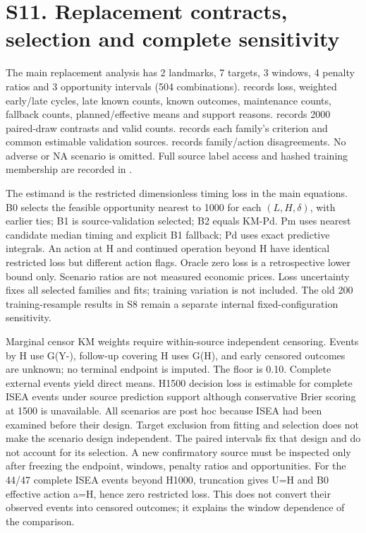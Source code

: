 \documentclass[10pt,a4paper]{article}
\begin{document}
\section*{S11. Replacement contracts, selection and complete sensitivity}
The main replacement analysis has 2 landmarks, 7 targets, 3 windows, 4 penalty ratios and 3 opportunity intervals (504 combinations).  records loss, weighted early/late cycles, late known counts, known outcomes, maintenance counts, fallback counts, planned/effective means and support reasons.  records 2000 paired-draw contrasts and valid counts.  records each family's criterion and common estimable validation sources.  records family/action disagreements. No adverse or NA scenario is omitted. Full source label access and hashed training membership are recorded in .

The estimand is the restricted dimensionless timing loss in the main equations. B0 selects the feasible opportunity nearest to 1000 for each $(L,H,\delta)$, with earlier ties; B1 is source-validation selected; B2 equals KM-Pd. Pm uses nearest candidate median timing and explicit B1 fallback; Pd uses exact predictive integrals. An action at H and continued operation beyond H have identical restricted loss but different action flags. Oracle zero loss is a retrospective lower bound only. Scenario ratios are not measured economic prices. Loss uncertainty fixes all selected families and fits; training variation is not included. The old 200 training-resample results in S8 remain a separate internal fixed-configuration sensitivity.

Marginal censor KM weights require within-source independent censoring. Events by H use G(Y-), follow-up covering H uses G(H), and early censored outcomes are unknown; no terminal endpoint is imputed. The floor is 0.10. Complete external events yield direct means. H1500 decision loss is estimable for complete ISEA events under source prediction support although conservative Brier scoring at 1500 is unavailable. All scenarios are post hoc because ISEA had been examined before their design. Target exclusion from fitting and selection does not make the scenario design independent. The paired intervals fix that design and do not account for its selection. A new confirmatory source must be inspected only after freezing the endpoint, windows, penalty ratios and opportunities. For the 44/47 complete ISEA events beyond H1000, truncation gives U=H and B0 effective action a=H, hence zero restricted loss. This does not convert their observed events into censored outcomes; it explains the window dependence of the comparison.
\end{document}
